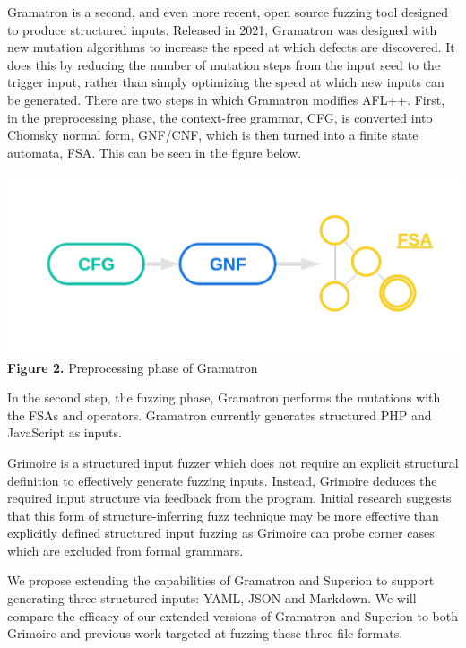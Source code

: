 \documentclass[12pt]{diazessay}
\begin{document}
\clearpage

Gramatron\cite{srivastava2021gramatron} is a second, and even more recent, open source fuzzing tool designed to produce structured inputs.
Released in 2021, Gramatron was designed with new mutation algorithms to increase the speed at which defects are discovered.
It does this by reducing the number of mutation steps from the input seed to the trigger input, rather than simply optimizing the speed at which new inputs can be generated. There are two steps in which Gramatron modifies AFL++. First, in the preprocessing phase, the context-free grammar, CFG, is converted into Chomsky normal form, GNF/CNF, which is then turned into a finite state automata, FSA. This can be seen in the figure below.

\vspace{-1cm}
\begin{center}
	\includegraphics[scale=0.4, trim={0 3cm 0 0}, clip]{gramatronfig.png}
	\textbf{Figure 2.} Preprocessing phase of Gramatron
\end{center}
\vspace{6mm}

In the second step, the fuzzing phase, Gramatron performs the mutations with the FSAs and operators. Gramatron currently generates structured PHP and JavaScript as inputs.

Grimoire\cite{GRIMOIRE} is a structured input fuzzer which does not require an explicit structural definition to effectively generate fuzzing inputs.
Instead, Grimoire deduces the required input structure via feedback from the program.
Initial research suggests that this form of structure-inferring fuzz technique may be more effective than explicitly defined structured input fuzzing as Grimoire can probe corner cases which are excluded from formal grammars.

We propose extending the capabilities of Gramatron and Superion to support generating three structured inputs: YAML\cite{YAMLdraft}, JSON and Markdown.
We will compare the efficacy of our extended versions of Gramatron and Superion to both Grimoire and previous work targeted at fuzzing these three file formats.
\end{document}
